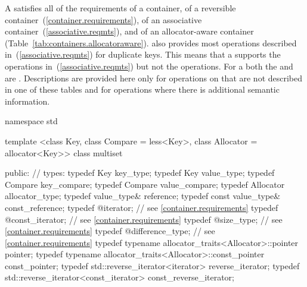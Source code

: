 \pnum
A  satisfies all of the requirements of a container, of a
reversible container~(\ref{container.requirements}), of an associative
container~(\ref{associative.reqmts}), and of an allocator-aware container
(Table~\ref{tab:containers.allocatoraware}).
also provides most operations described in~(\ref{associative.reqmts})
for duplicate keys.
This means that a
supports the
operations in~(\ref{associative.reqmts})
but not the
operations.
For a
both the
and
are
.
Descriptions are provided here only for operations on
that are not described in one of these tables
and for operations where there is additional semantic information.

\begin{codeblock}
namespace std {
  template <class Key, class Compare = less<Key>,
            class Allocator = allocator<Key>>
  class multiset {
  public:
    // types:
    typedef Key                                                 key_type;
    typedef Key                                                 value_type;
    typedef Compare                                             key_compare;
    typedef Compare                                             value_compare;
    typedef Allocator                                           allocator_type;
    typedef value_type&                                         reference;
    typedef const value_type&                                   const_reference;
    typedef @\impdefnc@                              iterator;        // see \ref{container.requirements}
    typedef @\impdefnc@                              const_iterator;  // see \ref{container.requirements}
    typedef @\impdefnc@                              size_type;       // see \ref{container.requirements}
    typedef @\impdefnc@                              difference_type; // see \ref{container.requirements}
    typedef typename allocator_traits<Allocator>::pointer       pointer;
    typedef typename allocator_traits<Allocator>::const_pointer const_pointer;
    typedef std::reverse_iterator<iterator>                     reverse_iterator;
    typedef std::reverse_iterator<const_iterator>               const_reverse_iterator;

}}
\end{codeblock}
